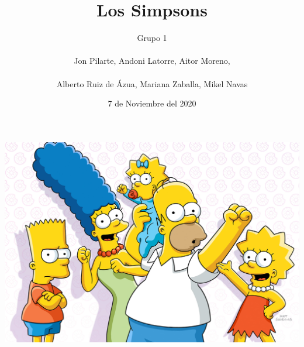 \documentclass{article}
\title{Los Simpsons}
\author{Grupo 1\\\\Jon Pilarte, Andoni Latorre, Aitor Moreno,\\\\Alberto Ruiz de Ázua, Mariana Zaballa, Mikel Navas}
\date{7 de Noviembre del 2020}
\begin{document}
\maketitle
\begin{center}
    \includegraphics[width=1\textwidth]{figuras/keyart_s32simp.jpg}
\end{center}
\newpage
%
%
%
%
\end{document}
